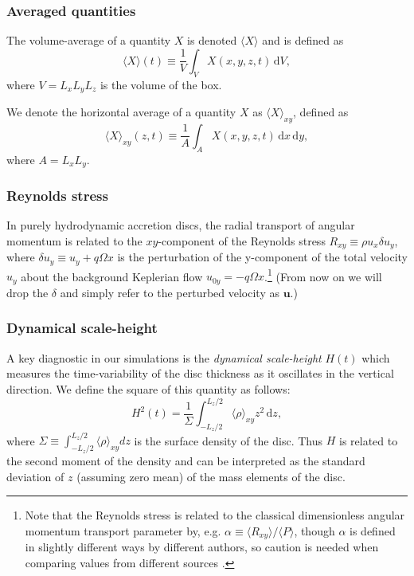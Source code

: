 \documentclass[fleqn,usenatbib]{mnras}
\newcommand{\dd}{\mathrm{d}}
\begin{document}
\subsubsection{Averaged quantities}
\label{METHODS_AveragedQuantities}
The volume-average of a quantity $X$ is denoted $\langle X \rangle$ and is defined as 
\begin{equation}
\langle X \rangle(t) \equiv \frac{1}{V} \int_V X(x, y, z, t) \, \dd V,
\end{equation}
where $V=L_x L_y L_z$ is the volume of the box.

We denote the horizontal average of a quantity $X$ as $\langle{X}\rangle_{xy}$, defined as
\begin{equation}
    \langle X \rangle_{xy}(z,t) \equiv \frac{1}{A} \int_A X(x,y,z,t) \, \dd x \, \dd y,
\end{equation}
where $A = L_x L_y$.


\subsubsection{Reynolds stress}
\label{METHODS_ReynoldsAndMagneticStressesAndAlpha}
In purely hydrodynamic accretion discs, the radial transport of angular momentum is related to the $xy$-component of the Reynolds stress $R_{xy} \equiv \rho u_x \delta u_y$, where $\delta u_y \equiv u_y + q\Omega x$ is the perturbation of the y-component of the total velocity $u_y$ about the background Keplerian flow $u_{0y} = -q \Omega x$.\footnote{Note that the Reynolds stress is related to the classical dimensionless angular momentum transport parameter by, e.g. $\alpha \equiv \langle R_{xy} \rangle / \langle P \rangle$,  though $\alpha$ is defined in slightly different ways by different authors, so caution is needed when comparing values from different sources \citep[e.g.,][]{pessah2008fundamental, heldlatter2018}.} (From now on we will drop the $\delta$ and simply refer to the perturbed velocity as $\textbf{u}$.)



\subsubsection{Dynamical scale-height}
A key diagnostic in our simulations is the \textit{dynamical scale-height} $H(t)$ which measures the time-variability of the disc thickness as it oscillates in the vertical direction. We define the square of this quantity as follows:
\begin{equation}
H^2(t) = \frac{1}{\Sigma} \int_{-L_z/2}^{L_z/2} \langle \rho \rangle_{xy} z^2 \, \dd z,
\label{EQUN_DynamicalScaleheight}
\end{equation}
where $\Sigma \equiv \int_{-L_z/2}^{L_z/2} \langle \rho \rangle_{xy} dz$ is the surface density of the disc. Thus $H$ is related to the second moment of the density and can be interpreted as the standard deviation of $z$ (assuming zero mean) of the mass elements of the disc. 
\end{document}
